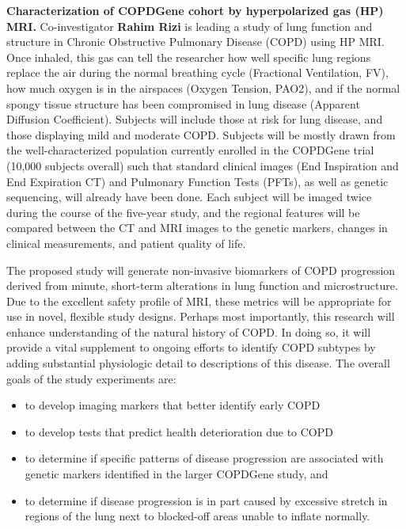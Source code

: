 \documentclass[11pt,]{article}
\begin{document}
\textbf{Characterization of COPDGene cohort by hyperpolarized gas (HP)
MRI.} Co-investigator \textbf{Rahim Rizi} is leading a study of lung
function and structure in Chronic Obstructive Pulmonary Disease (COPD)
using HP MRI. Once inhaled, this gas can tell the researcher how well
specific lung regions replace the air during the normal breathing cycle
(Fractional Ventilation, FV), how much oxygen is in the airspaces
(Oxygen Tension, PAO2), and if the normal spongy tissue structure has
been compromised in lung disease (Apparent Diffusion Coefficient).
Subjects will include those at risk for lung disease, and those
displaying mild and moderate COPD. Subjects will be mostly drawn from
the well-characterized population currently enrolled in the COPDGene
trial (10,000 subjects overall) such that standard clinical images (End
Inspiration and End Expiration CT) and Pulmonary Function Tests (PFTs),
as well as genetic sequencing, will already have been done. Each subject
will be imaged twice during the course of the five-year study, and the
regional features will be compared between the CT and MRI images to the
genetic markers, changes in clinical measurements, and patient quality
of life.

The proposed study will generate non-invasive biomarkers of COPD
progression derived from minute, short-term alterations in lung function
and microstructure. Due to the excellent safety profile of MRI, these
metrics will be appropriate for use in novel, flexible study designs.
Perhaps most importantly, this research will enhance understanding of
the natural history of COPD. In doing so, it will provide a vital
supplement to ongoing efforts to identify COPD subtypes by adding
substantial physiologic detail to descriptions of this disease. The
overall goals of the study experiments are:

\begin{itemize}
\itemsep1pt\parskip0pt
\item
  to develop imaging markers that better identify early COPD
\item
  to develop tests that predict health deterioration due to COPD
\item
  to determine if specific patterns of disease progression are
  associated with genetic markers identified in the larger COPDGene
  study, and
\item
  to determine if disease progression is in part caused by excessive
  stretch in regions of the lung next to blocked-off areas unable to
  inflate normally.
\end{itemize}
\end{document}
